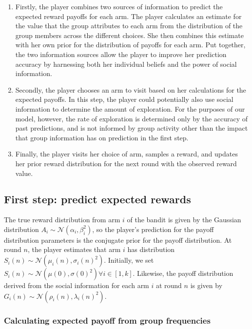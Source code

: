 \documentclass[11pt, a4paper]{article}
\begin{document}
\begin{enumerate}
\item Firstly, the player combines two sources of information to predict the expected reward payoffs for each arm. The player calculates an estimate for the value that the group attributes to each arm from the distribution of the group members across the different choices. She then combines this estimate with her own prior for the distribution of payoffs for each arm. Put together, the two information sources allow the player to improve her prediction accuracy by harnessing both her individual beliefs and the power of social information.
\item Secondly, the player chooses an arm to visit based on her calculations for the expected payoffs. In this step, the player could potentially also use social information to determine the amount of exploration. For the purposes of our model, however, the rate of exploration is determined only by the accuracy of past predictions, and is not informed by group activity other than the impact that group information has on prediction in the first step.
\item Finally, the player visits her choice of arm, samples a reward, and updates her prior reward distribution for the next round with the observed reward value.
\end{enumerate}

\subsection{First step: predict expected rewards}

The true reward distribution from arm $i$ of the bandit is given by the Gaussian distribution $A_i \sim \mathcal{N} (\alpha_i, \beta_i^2)$, so the player's prediction for the payoff distribution parameters is the conjugate prior for the payoff distribution. At round $n$, the player estimates that arm $i$ has distribution $S_i(n) \sim \mathcal{N} (\mu_i(n), \sigma_i(n)^2)$. Initially, we set $S_i(n) \sim \mathcal{N} (\mu(0), \sigma(0)^2) \forall i \in [1, k]$. Likewise, the payoff distribution derived from the social information for each arm $i$ at round $n$ is given by $G_i(n) \sim \mathcal{N} (\rho_i(n), \lambda_i(n)^2)$.

\subsubsection{Calculating expected payoff from group frequencies}
\end{document}
